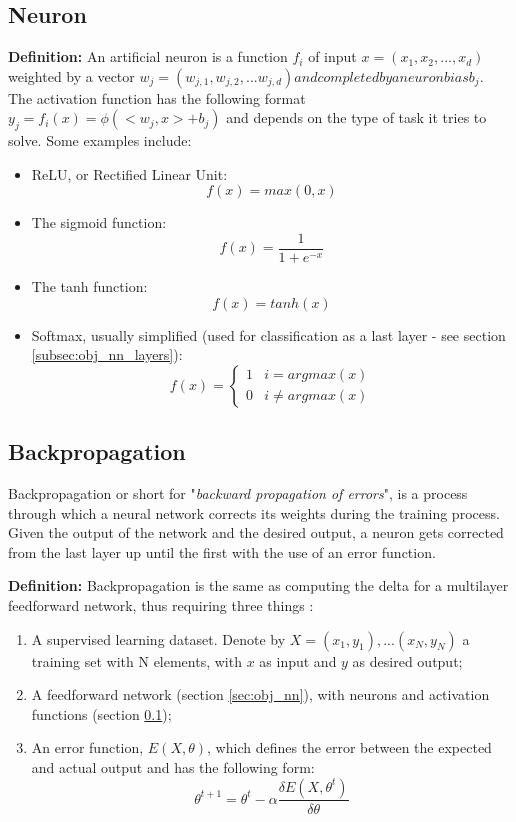 \subsection{Neuron}
\label{subsec:obj_nn_neuron}

\qquad \textbf{Definition:} An artificial neuron is a function $f_i$ of input $x = (x_1, x_2, ... , x_d)$ weighted by a vector $w_j = (w_{j,1}, w_{j,2}, ... w_{j,d}) and completed by a neuron bias b_j$. The activation function has the following format $y_j = f_i(x) = \phi(< w_j, x > + b_j)$ \cite{backpropagation} and depends on the type of task it tries to solve. Some examples include:

\begin{itemize}
\item{ReLU, or Rectified Linear Unit: \[ f(x) = max(0, x) \]}
\item{The sigmoid function: \[ f(x) = \frac{1}{1 + e^{-x}} \]} 
\item{The tanh function: \[ f(x) = tanh(x) \]}
\item{Softmax, usually simplified (used for classification as a last layer - see section \ref{subsec:obj_nn_layers}): 
\[ f(x) = 
	\begin{cases} 
		1 & i = argmax(x) \\
		0 & i \neq argmax(x)
	\end{cases}
\]}
\end{itemize}

\subsection{Backpropagation}
\label{subsec:obj_nn_backpropagation}

\qquad Backpropagation or short for "\textit{backward propagation of errors}", is a process through which a neural network corrects its weights during the training process. Given the output of the network and the desired output, a neuron gets corrected from the last layer up until the first with the use of an error function.

\qquad \textbf{Definition:} Backpropagation is the same as computing the delta for a multilayer feedforward network, thus requiring three things \cite{brilliant:backpropagation}:  

\begin{enumerate}
\item{A supervised learning dataset. Denote by $X = (x_1, y_1), ... (x_N, y_N)$ a training set with N elements, with $x$ as input and $y$ as desired output;}
\item{A feedforward network (section \ref{sec:obj_nn}), with neurons and activation functions (section \ref{subsec:obj_nn_neuron});}
\item{An error function, $E(X, \theta)$, which defines the error between the expected and actual output and has the following form: \[ \theta^{t+1} = \theta^t - \alpha \frac{\delta E(X, \theta^t)}{\delta \theta} \]}
\end{enumerate}

